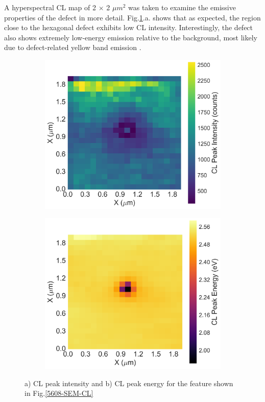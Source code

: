 A hyperspectral CL map of 2 $\times$ 2 $\mu m^{2}$ was taken to examine the emissive properties of the defect in more detail. Fig.\ref{11-CL}.a. shows that as expected, the region close to the hexagonal defect exhibits low CL intensity. Interestingly, the defect also shows extremely low-energy emission relative to the background, most likely due to defect-related yellow band emission \cite{Lyons2010}.

\begin{figure}[h]
	
	\begin{subfigure}[b]{0.48\textwidth}
		\centering
		\includegraphics[width=1\linewidth]{Figs/Ch3/11-peak}
		\caption{}
		
	\end{subfigure}%
	\hspace*{0.5cm}
	\begin{subfigure}[b]{0.48\textwidth}
		\centering
		\includegraphics[width=1\linewidth]{Figs/Ch3/11-centre}
		\caption{}
	\end{subfigure}%
	
	\caption{a) CL peak intensity and b) CL peak energy for the feature shown in Fig.\ref{5608-SEM-CL}}
	\label{11-CL}
\end{figure}
